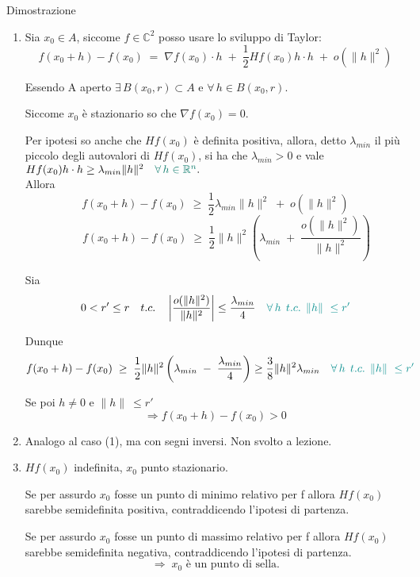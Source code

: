 \documentclass[x11names]{article}
\begin{document}
	\begin{es}{Dimostrazione}
		\begin{enumerate}
			\item Sia $x_0 \in A$, siccome $f\in\mathbb{C}^2$ posso usare lo sviluppo di Taylor: 
			\[
			f(x_0 + h) - f(x_0) \;=\; \nabla f(x_0)\cdot h \;+\; \frac{1}{2}Hf(x_0)h\cdot h \;+\; o(\|h\|^2)
			\]
			
			Essendo A aperto $\exists\,B(x_0,r) \subset A$ e $\forall\,h\in B(x_0,r)$. \smallskip
			
			Siccome $x_0$ è stazionario so che $\nabla f(x_0)=0$. \smallskip
			
			Per ipotesi so anche che $Hf(x_0)$ è definita positiva, allora, detto $\lambda_{min}$ il più piccolo degli autovalori di $Hf(x_0)$, si ha che $\lambda_{min}>0$ e vale $Hf(x_0)h\cdot h \geq \lambda_{min}\|h\|^2\quad{\color{CadmiumGreen}\forall\,h\in\mathbb{R}^n}.$ \\
			
			Allora
			\[
			f(x_0 + h) - f(x_0) \;\geq\; \frac{1}{2}\lambda_{min}\|h\|^2 \;+\; o(\|h\|^2)
			\]
			\[
			\quad\quad f(x_0 + h) - f(x_0) \;\geq\; \frac{1}{2}\|h\|^2 \left( \lambda_{min} \;+\; \frac{o(\|h\|^2)}{\|h\|^2} \right)
			\]
			
			Sia 
			\[ 
			0<r'\leq r \quad t.c.\quad \left|\frac{o(\|h\|^2)}{\|h\|^2} \right| \leq \frac{\lambda_{min}}{4} \quad {\color{BlueGreen} \forall\,h\;\, t.c.\;\,\|h\|\ \leq r'}
			\]
			
			Dunque 
			\[
			f(x_0 + h) - f(x_0) \;\geq\; \frac{1}{2}\|h\|^2 \left( \lambda_{min} \;-\; \frac{\lambda_{min}}{4} \right) \geq \frac{3}{8}\|h\|^2\lambda_{min} \quad {\color{BlueGreen} \forall\,h\;\, t.c.\;\,\|h\|\ \leq r'}
			\]
			
			Se poi $h \neq 0$ e $\|h\|\ \leq r' $\\
			\[
			\Longrightarrow f(x_0 + h) - f(x_0) > 0
			\] \smallskip
			
			\item Analogo al caso (1), ma con segni inversi. Non svolto a lezione. \\
			
			\item $Hf(x_0)$ indefinita, $x_0$ punto stazionario. \smallskip
			
			Se per assurdo $x_0$ fosse un punto di minimo relativo per f allora $Hf(x_0)$ sarebbe semidefinita positiva, contraddicendo l'ipotesi di partenza. \smallskip
			
			Se per assurdo $x_0$ fosse un punto di massimo relativo per f allora $Hf(x_0)$ sarebbe semidefinita negativa, contraddicendo l'ipotesi di partenza. \smallskip
			\[\Longrightarrow\;x_0\text{ è un punto di sella.}\]
			
			
			
		\end{enumerate}
		
	\end{es}
	
\end{document}
